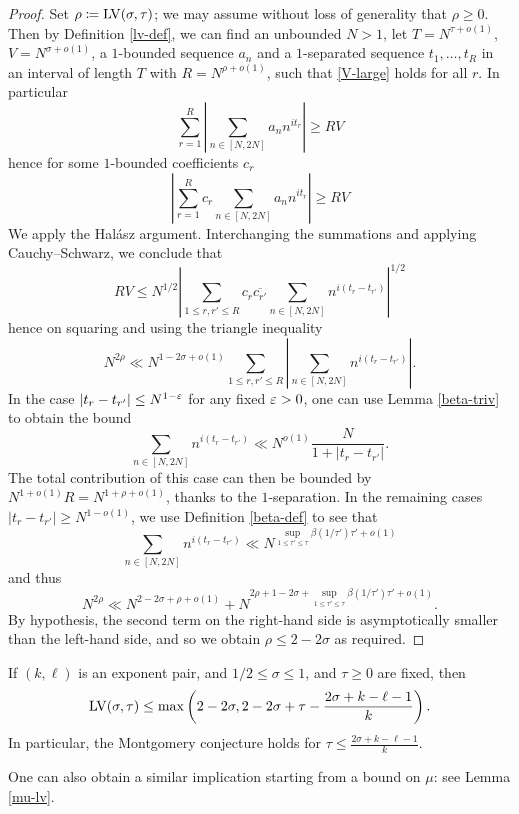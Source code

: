 \begin{proof}  Set $\rho \coloneqq \mathrm{LV}(\sigma,\tau)$; we may assume without loss of generality that $\rho \geq 0$.  Then by Definition \ref{lv-def}, we can find an unbounded $N > 1$, let $T = N^{\tau + o(1)}$, $V = N^{\sigma + o(1)}$, a $1$-bounded sequence $a_n$ and a $1$-separated sequence $t_1,\dots,t_R$ in an interval of length $T$ with $R = N^{\rho+o(1)}$, such that \eqref{V-large} holds for all $r$.  In particular
$$ \sum_{r=1}^R \left|\sum_{n \in [N,2N]} a_n n^{it_r} \right| \geq RV$$
hence for some $1$-bounded coefficients $c_r$
$$ \left|\sum_{r=1}^R c_r \sum_{n \in [N,2N]} a_n n^{it_r} \right| \geq RV$$
We apply the Hal\'asz argument. Interchanging the summations and applying Cauchy--Schwarz, we conclude that
$$ RV \leq N^{1/2} \left|\sum_{1 \leq r,r' \leq R} c_r \overline{c_{r'}} \sum_{n \in [N,2N]} n^{i(t_r-t_{r'})} \right|^{1/2}$$
hence on squaring and using the triangle inequality
$$ N^{2\rho} \ll N^{1-2\sigma+o(1)} \sum_{1 \leq r,r' \leq R} \left|\sum_{n \in [N,2N]} n^{i(t_r-t_{r'})} \right|.$$
In the case $|t_r - t_{r'}| \leq N^{1-\varepsilon}$ for any fixed $\varepsilon>0$, one can use Lemma \ref{beta-triv} to obtain the bound
$$ \sum_{n \in [N,2N]} n^{i(t_r-t_{r'})} \ll N^{o(1)} \frac{N}{1 + |t_r - t_{r'}|}.$$
The total contribution of this case can then be bounded by $N^{1+o(1)} R = N^{1+\rho+o(1)}$, thanks to the $1$-separation.
In the remaining cases $|t_r - t_{r'}| \geq N^{1-o(1)}$, we use Definition \ref{beta-def} to see that
$$ \sum_{n \in [N,2N]} n^{i(t_r-t_{r'})} \ll N^{\sup_{1 \leq \tau' \leq \tau} \beta(1/\tau') \tau' + o(1)}$$
and thus
$$ N^{2\rho} \ll N^{2-2\sigma+\rho+o(1)} + N^{2\rho + 1-2\sigma+\sup_{1 \leq \tau' \leq \tau} \beta(1/\tau') \tau' + o(1)}.$$
By hypothesis, the second term on the right-hand side is asymptotically smaller than the left-hand side, and so we obtain $\rho \leq 2-2\sigma$ as required.
\end{proof}

\begin{corollary}\label{exp-lv}  If $(k,\ell)$ is an exponent pair, and $1/2 \leq \sigma \leq 1$, and $\tau \geq 0$ are fixed, then
$$\mathrm{LV}(\sigma,\tau) \leq \max\left( 2-2\sigma, 2 - 2\sigma + \tau - \frac{2\sigma+k-\ell-1}{k} \right).$$
In particular, the Montgomery conjecture holds for $\tau \leq \frac{2\sigma+k-\ell-1}{k}$.
\end{corollary}

One can also obtain a similar implication starting from a bound on $\mu$: see Lemma \ref{mu-lv}.

